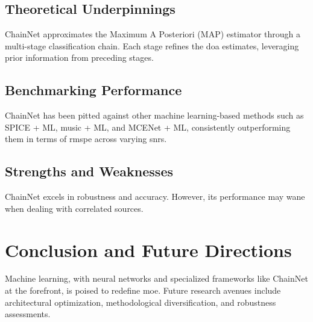 \subsection{Theoretical Underpinnings}
ChainNet approximates the Maximum A Posteriori (MAP) estimator through a multi-stage classification chain. Each stage
refines the \gls{doa} estimates, leveraging prior information from preceding stages.

\subsection{Benchmarking Performance}
ChainNet has been pitted against other machine learning-based methods such as SPICE + ML, \gls{music} + ML, and MCENet
+ ML, consistently outperforming them in terms of \gls{rmspe} across varying \gls{snr}s.

\subsection{Strengths and Weaknesses}
ChainNet excels in robustness and accuracy. However, its performance may wane when dealing with correlated sources.


\section{Conclusion and Future Directions}
Machine learning, with neural networks and specialized frameworks like ChainNet at the forefront, is poised to redefine \gls{moe}. Future research avenues include architectural optimization, methodological diversification, and robustness assessments.
